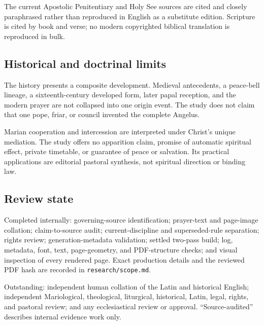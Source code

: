 The current Apostolic Penitentiary and Holy See sources are cited and closely paraphrased rather than reproduced in English as a substitute edition. Scripture is cited by book and verse; no modern copyrighted biblical translation is reproduced in bulk.

\subsection{Historical and doctrinal limits}

The history presents a composite development. Medieval antecedents, a peace-bell lineage, a sixteenth-century developed form, later papal reception, and the modern prayer are not collapsed into one origin event. The study does not claim that one pope, friar, or council invented the complete Angelus.

Marian cooperation and intercession are interpreted under Christ's unique mediation. The study offers no apparition claim, promise of automatic spiritual effect, private timetable, or guarantee of peace or salvation. Its practical applications are editorial pastoral synthesis, not spiritual direction or binding law.

\subsection{Review state}

Completed internally: governing-source identification; prayer-text and page-image collation; claim-to-source audit; current-discipline and superseded-rule separation; rights review; generation-metadata validation; settled two-pass build; log, metadata, font, text, page-geometry, and PDF-structure checks; and visual inspection of every rendered page. Exact production details and the reviewed PDF hash are recorded in \texttt{research/scope.md}.

Outstanding: independent human collation of the Latin and historical English; independent Mariological, theological, liturgical, historical, Latin, legal, rights, and pastoral review; and any ecclesiastical review or approval. ``Source-audited'' describes internal evidence work only.
